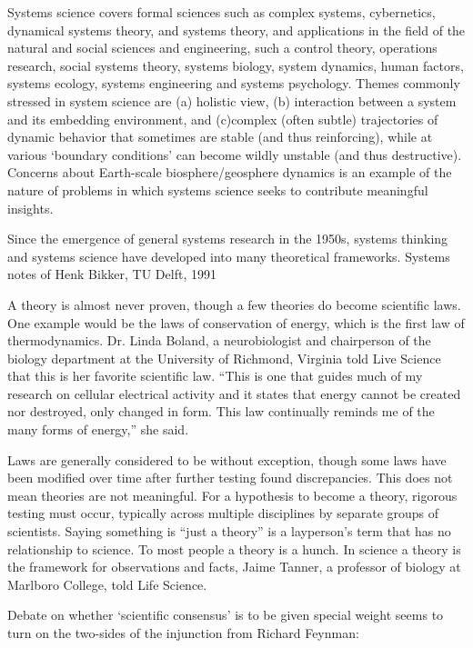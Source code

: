 Systems science covers formal sciences such as complex systems, cybernetics, dynamical systems theory, and systems theory, and applications in the field of the natural and social sciences and engineering, such a control theory, operations research, social systems theory, systems biology, system dynamics, human factors, systems ecology, systems engineering and systems psychology. Themes commonly stressed in system science are (a) holistic view, (b) interaction between a system and its embedding environment, and (c)complex (often subtle) trajectories of dynamic behavior that sometimes are stable (and thus reinforcing), while at various `boundary conditions’ can become wildly unstable (and thus destructive). Concerns about Earth-scale biosphere/geosphere dynamics is an example of the nature of problems in which systems science seeks to contribute meaningful insights.

Since the emergence of general systems research in the 1950s, systems thinking and systems science have developed into many theoretical frameworks.
Systems notes of Henk Bikker, TU Delft, 1991

A theory is almost never proven, though a few theories do become scientific laws. One example would be the laws of conservation of energy, which is the first law of thermodynamics. Dr. Linda Boland, a neurobiologist and chairperson of the biology department at the University of Richmond, Virginia told Live Science that this is her favorite scientific law. ``This is one that guides much of my research on cellular electrical activity and it states that energy cannot be created nor destroyed, only changed in form. This law continually reminds me of the many forms of energy,'' she said.

Laws are generally considered to be without exception, though some laws have been modified over time after further testing found discrepancies. This does not mean theories are not meaningful. For a hypothesis to become a theory, rigorous testing must occur, typically across multiple disciplines by separate groups of scientists. Saying something is ``just a theory'' is a layperson’s term that has no relationship to science. To most people a theory is a hunch. In science a theory is the framework for observations and facts, Jaime Tanner, a professor of biology at Marlboro College, told Life Science.

Debate on whether `scientific consensus’ is to be given special weight seems to turn on the two-sides of the injunction from Richard Feynman:

